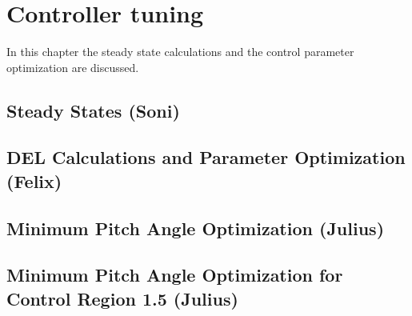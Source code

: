 \chapter{Controller tuning} \label{chapter:controller tuning}
In this chapter the steady state calculations and the control parameter optimization are discussed.
\section{Steady States (Soni)} \label{steady states}


\section{DEL Calculations and Parameter Optimization (Felix)} \label{DLC 1.2 tuning}


\section{Minimum Pitch Angle Optimization (Julius)} \label{minimum pitch angle static}


\section{Minimum Pitch Angle Optimization for Control Region 1.5 (Julius)} 

